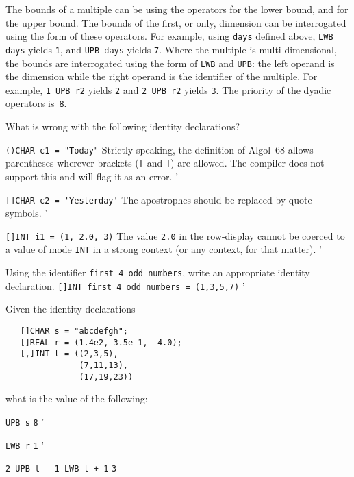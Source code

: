 The bounds of a multiple can be
 using the operators
 for the lower bound, and  for the upper bound.
The bounds of the first, or only, dimension can be interrogated using
the  form of these operators.  For
example, using \verb|days| defined above, \verb|LWB days| yields
\verb|1|, and \verb|UPB days| yields \verb|7|. Where the multiple is
multi-dimensional, the bounds are interrogated using the
 form of \verb|LWB| and \verb|UPB|: the
left operand is the dimension while the right operand is the
identifier of the multiple.  For example, \verb|1 UPB r2| yields
\verb|2| and \verb|2 UPB r2| yields \verb|3|.  The priority of the
dyadic operators is~\verb|8|.

\begin{exercise}
\item What is wrong with the following identity declarations?
\begin{subex}
\item \verb|()CHAR c1 = "Today"| \subans Strictly speaking, the
definition of Algol~68 allows parentheses wherever brackets (\verb|[|
and \verb|]|) are allowed. The
 compiler does not support this and will flag it as an error.
'
\item \verb|[]CHAR c2 = 'Yesterday'| \subans The apostrophes should
be replaced by quote symbols.
'
\item \verb|[]INT i1 = (1, 2.0, 3)| \subans The value \verb|2.0| in
the row-display cannot be coerced to a value of mode \verb|INT| in a
strong context (or any context, for that matter).
'
\end{subex}
\item Using the identifier \verb|first 4 odd numbers|, write an
appropriate identity declaration.
\ans \verb|[]INT first 4 odd numbers = (1,3,5,7)|
'
\item Given the identity declarations
\begin{verbatim}
   []CHAR s = "abcdefgh";
   []REAL r = (1.4e2, 3.5e-1, -4.0);
   [,]INT t = ((2,3,5),
               (7,11,13),
               (17,19,23))
\end{verbatim}
\noindent
what is the value of the following:
\begin{subex}
\item \verb|UPB s| \subans \verb|8|
'
\item \verb|LWB r| \subans \verb|1|
'
\item \verb|2 UPB t - 1 LWB t + 1| \subans \verb|3|

\end{subex}
\end{exercise}
